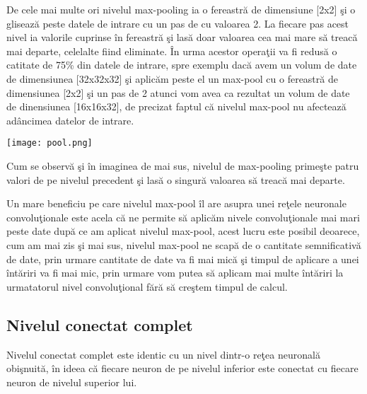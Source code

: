 \par

De cele mai multe ori nivelul max-pooling ia o fereastr\u{a} de dimensiune [2x2] \c{s}i o gliseaz\u{a} peste datele de intrare cu un pas de cu valoarea 2. La fiecare pas acest nivel ia valorile cuprinse \^{i}n fereastr\u{a} \c{s}i las\u{a} doar valoarea cea mai mare s\u{a} treac\u{a} mai departe, celelalte fiind eliminate. \^{I}n urma acestor opera\c{t}ii va fi redus\u{a} o catitate de 75\% din datele de intrare, spre exemplu dac\u{a} avem un volum de date de dimensiunea [32x32x32] \c{s}i aplic\u{a}m peste el un max-pool cu o fereastr\u{a} de dimensiunea [2x2] \c{s}i un pas de 2 atunci vom avea ca rezultat un volum de date de dinensiunea [16x16x32], de precizat faptul c\u{a} nivelul max-pool nu afecteaz\u{a} ad\^{a}ncimea datelor de intrare.

\begin{center}
\texttt{[image: pool.png]}
\end{center}

Cum se observ\u{a} \c{s}i \^{i}n imaginea de mai sus, nivelul de max-pooling prime\c{s}te patru valori de pe nivelul precedent \c{s}i las\u{a} o singur\u{a} valoarea s\u{a} treac\u{a} mai departe.

Un mare beneficiu pe care nivelul max-pool \^{i}l are asupra unei re\c{t}ele neuronale convolu\c{t}ionale este acela c\u{a} ne permite s\u{a} aplic\u{a}m nivele convolu\c{t}ionale mai mari peste date dup\u{a} ce am aplicat nivelul max-pool, acest lucru este posibil deoarece, cum am mai zis \c{s}i mai sus, nivelul max-pool ne scap\u{a} de o cantitate semnificativ\u{a} de date, prin urmare cantitate de date va fi mai mic\u{a} \c{s}i timpul de aplicare a unei \^{i}nt\u{a}riri va fi mai mic, prin urmare vom putea s\u{a} aplicam mai multe \^{i}nt\u{a}riri la urmatatorul nivel convolu\c{t}ional f\u{a}r\u{a} s\u{a} cre\c{s}tem timpul de calcul.

\subsection{Nivelul conectat complet}

Nivelul conectat complet este identic cu un nivel dintr-o re\c{t}ea neuronal\u{a} obi\c{s}nuit\u{a}, \^{i}n ideea c\u{a} fiecare neuron de pe nivelul inferior este conectat cu fiecare neuron de nivelul superior lui.

\par

